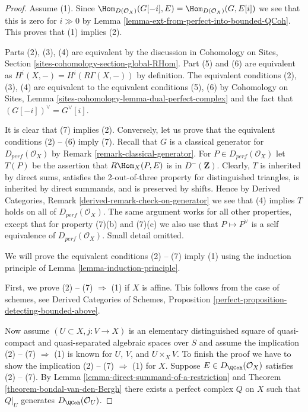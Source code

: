 \begin{proof}
Assume (1). Since
$\Hom_{D(\mathcal{O}_X)}(G[-i], E) = \Hom_{D(\mathcal{O}_X)}(G, E[i])$
we see that this is zero for $i \gg 0$ by
Lemma \ref{lemma-ext-from-perfect-into-bounded-QCoh}. This proves
that (1) implies (2).

\medskip\noindent
Parts (2), (3), (4) are equivalent by the discussion in
Cohomology on Sites, Section \ref{sites-cohomology-section-global-RHom}.
Part (5) and (6) are equivalent as $H^i(X, -) = H^i(R\Gamma(X, -))$
by definition. The equivalent conditions (2), (3), (4) are
equivalent to the equivalent conditions (5), (6) by
Cohomology on Sites, Lemma \ref{sites-cohomology-lemma-dual-perfect-complex}
and the fact that $(G[-i])^\vee = G^\vee[i]$.

\medskip\noindent
It is clear that (7) implies (2). Conversely,
let us prove that the equivalent conditions (2) -- (6) imply (7).
Recall that $G$ is a  classical generator for $D_{perf}(\mathcal{O}_X)$ by
Remark \ref{remark-classical-generator}.
For $P \in D_{perf}(\mathcal{O}_X)$ let $T(P)$ be the assertion that
$R\Hom_X(P, E)$ is in $D^-(\mathbf{Z})$.
Clearly, $T$ is inherited by direct sums,
satisfies the 2-out-of-three property for distinguished
triangles, is inherited by direct summands, and is preserved by shifts.
Hence by Derived Categories, Remark \ref{derived-remark-check-on-generator}
we see that (4) implies $T$ holds on all of $D_{perf}(\mathcal{O}_X)$.
The same argument works for all other properties, except that for property
(7)(b) and (7)(c) we also use that $P \mapsto P^\vee$ is a self
equivalence of $D_{perf}(\mathcal{O}_X)$. Small detail omitted.

\medskip\noindent
We will prove the equivalent conditions (2) -- (7) imply (1)
using the induction principle of
Lemma \ref{lemma-induction-principle}.

\medskip\noindent
First, we prove (2) -- (7) $\Rightarrow$ (1) if $X$ is affine.
This follows from the case of schemes, see
Derived Categories of Schemes, Proposition
\ref{perfect-proposition-detecting-bounded-above}.

\medskip\noindent
Now assume $(U \subset X, j : V \to X)$ is an elementary distinguished
square of quasi-compact and quasi-separated algebraic spaces over $S$
and assume the implication (2) -- (7) $\Rightarrow$ (1)
is known for $U$, $V$, and $U \times_X V$. To finish the proof
we have to show the implication (2) -- (7) $\Rightarrow$ (1) for $X$.
Suppose $E \in D_\QCoh(\mathcal{O}_X)$ satisfies (2) -- (7).
By Lemma \ref{lemma-direct-summand-of-a-restriction} and
Theorem \ref{theorem-bondal-van-den-Bergh} there exists a perfect
complex $Q$ on $X$ such that $Q|_U$ generates $D_\QCoh (\mathcal{O}_U)$.


\end{proof}

